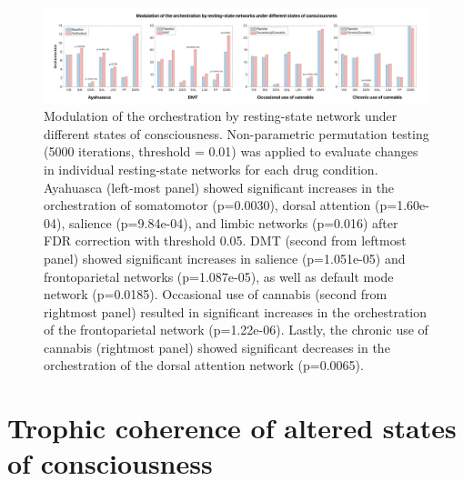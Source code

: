 \begin{figure}[h]
    \centering
    \includegraphics[width=\textwidth]{images/Figure idk GEC changes.png}
    \caption[Modulation of orchestration by resting-state network]{Modulation
of the orchestration by resting-state network under different states of
consciousness. Non-parametric permutation testing (5000 iterations,
threshold = 0.01) was applied to evaluate changes in individual
resting-state networks for each drug condition. Ayahuasca (left-most
panel) showed significant increases in the orchestration of somatomotor
(p=0.0030), dorsal attention (p=1.60e-04), salience (p=9.84e-04), and
limbic networks (p=0.016) after FDR correction with threshold 0.05. DMT
(second from leftmost panel) showed significant increases in salience
(p=1.051e-05) and frontoparietal networks (p=1.087e-05), as well as
default mode network (p=0.0185). Occasional use of cannabis (second from
rightmost panel) resulted in significant increases in the orchestration
of the frontoparietal network (p=1.22e-06). Lastly, the chronic use of
cannabis (rightmost panel) showed significant decreases in the
orchestration of the dorsal attention network (p=0.0065).}
    \label{fig:gecmod}
\end{figure}

\section{Trophic coherence of altered states of consciousness}

